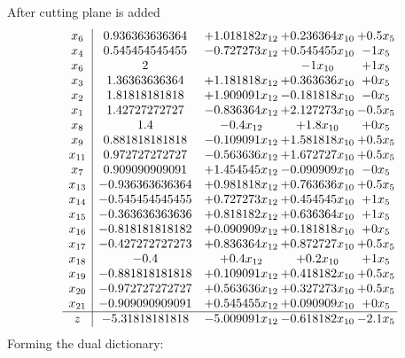 \documentclass[11pt]{article}
\begin{document}
 After cutting plane is added 
\[\begin{array}{c| c c@{\hskip 2pt} c@{\hskip 2pt} c@{\hskip 2pt} }
 x_{6}   &  0.936363636364 & + 1.018182 x_{12} & + 0.236364 x_{10} & + 0.5 x_{5}\\
 x_{4}   &  0.545454545455 & -0.727273 x_{12} & + 0.545455 x_{10} & -1 x_{5}\\
 x_{6}   &  2  &   & -1 x_{10} & + 1 x_{5}\\
 x_{3}   &  1.36363636364 & + 1.181818 x_{12} & + 0.363636 x_{10} & + 0 x_{5}\\
 x_{2}   &  1.81818181818 & + 1.909091 x_{12} & -0.181818 x_{10} & -0 x_{5}\\
 x_{1}   &  1.42727272727 & -0.836364 x_{12} & + 2.127273 x_{10} & -0.5 x_{5}\\
 x_{8}   &  1.4 & -0.4 x_{12} & + 1.8 x_{10} & + 0 x_{5}\\
 x_{9}   &  0.881818181818 & -0.109091 x_{12} & + 1.581818 x_{10} & + 0.5 x_{5}\\
 x_{11}   &  0.972727272727 & -0.563636 x_{12} & + 1.672727 x_{10} & + 0.5 x_{5}\\
 x_{7}   &  0.909090909091 & + 1.454545 x_{12} & -0.090909 x_{10} & -0 x_{5}\\
 x_{13}   &  -0.936363636364 & + 0.981818 x_{12} & + 0.763636 x_{10} & + 0.5 x_{5}\\
 x_{14}   &  -0.545454545455 & + 0.727273 x_{12} & + 0.454545 x_{10} & + 1 x_{5}\\
 x_{15}   &  -0.363636363636 & + 0.818182 x_{12} & + 0.636364 x_{10} & + 1 x_{5}\\
 x_{16}   &  -0.818181818182 & + 0.090909 x_{12} & + 0.181818 x_{10} & + 0 x_{5}\\
 x_{17}   &  -0.427272727273 & + 0.836364 x_{12} & + 0.872727 x_{10} & + 0.5 x_{5}\\
 x_{18}   &  -0.4 & + 0.4 x_{12} & + 0.2 x_{10} & + 1 x_{5}\\
 x_{19}   &  -0.881818181818 & + 0.109091 x_{12} & + 0.418182 x_{10} & + 0.5 x_{5}\\
 x_{20}   &  -0.972727272727 & + 0.563636 x_{12} & + 0.327273 x_{10} & + 0.5 x_{5}\\
 x_{21}   &  -0.909090909091 & + 0.545455 x_{12} & + 0.090909 x_{10} & + 0 x_{5}\\
\hline
z    &  -5.31818181818 & -5.009091 x_{12} & -0.618182 x_{10} & -2.1 x_{5}\\
\end{array}\]
Forming the dual dictionary:
\end{document}
